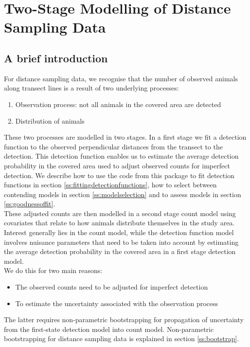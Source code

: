\section{Two-Stage Modelling of Distance Sampling Data}
\subsection{A brief introduction}
For distance sampling data, we recognise that the number of observed animals along transect lines is a result of two underlying processes: 
\begin{enumerate}
\item{Observation process: not all animals in the covered area are detected}
\item{Distribution of animals}
\end{enumerate}

\noindent These two processes are modelled in two stages. In a first stage we fit a detection function to the observed perpendicular distances from the transect to the detection. This detection function enables us to estimate the average detection probability in the covered area used to adjust observed counts for imperfect detection. We describe how to use the code from this package to fit detection functions in section \ref{ss:fittingdetectionfunctions}, how to select between contending models in section \ref{ss:modelselection} and to assess models in section \ref{ss:goodnessoffit}. \\
These adjusted counts are then modelled in a second stage count model using covariates that relate to how animals distribute themselves in the study area. \\
Interest generally lies in the count model, while the detection function model involves nuisance parameters that need to be taken into account by estimating the average detection probability in the covered area in a first stage detection model. \\
We do this for two main reasons:
\begin{itemize}
\item{The observed counts need to be adjusted for imperfect detection}
\item{To estimate the uncertainty associated with the observation process
}
\end{itemize}
The latter requires non-parametric bootstrapping for propagation of uncertainty from the first-state detection model into count model. Non-parametric bootstrapping for distance sampling data is explained in section \ref{ss:bootstrap}.

